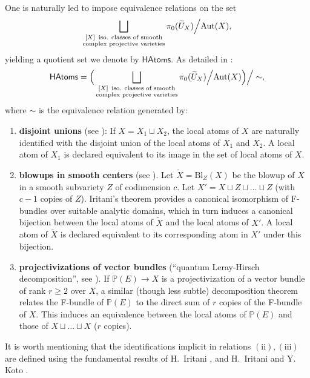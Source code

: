 \documentclass[12pt,a4paper]{amsart}
\theoremstyle{definition}
\theoremstyle{remark}
\begin{document}
One is naturally led to impose equivalence relations on the set
\[
\bigsqcup_{\substack{
      [X]\text{\, iso. classes of smooth}\\
      \text{complex projective varieties}
    }}
    \pi_{0}(\widetilde U_{X}) \Big/ \mathrm{Aut}(X),
\]
yielding a quotient set we denote by \(\mathsf{HAtoms}\). As detailed in \cite{katzarkovpantevyu}:
\[
\mathsf{HAtoms}
  = \Big(\bigsqcup_{\substack{
      [X]\text{\, iso. classes of smooth}\\
      \text{complex projective varieties}
    }}
    \pi_{0}(\widetilde U_{X}) \Big/ \mathrm{Aut}(X) \Big)\Big/ \sim,
\]
where \(\sim\) is the equivalence relation generated by:
\begin{enumerate}[label=(\roman*)]
  \item \textbf{disjoint unions} (see \cite[Section 5.2.3]{katzarkovpantevyu}):  If $X = X_1 \sqcup X_2$, the local atoms of $X$ are naturally identified with the disjoint union of the local atoms of $X_1$ and $X_2$. A local atom of $X_1$ is declared equivalent to its image in the set of local atoms of $X$.
  \item \textbf{blowups in smooth centers} (see \cite[Section 5.2.4]{katzarkovpantevyu}). Let $\widetilde X= \mathrm{Bl}_Z(X)$ be the blowup of $X$ in a smooth subvariety $Z$ of codimension $c$. Let $X' = X \sqcup Z \sqcup \ldots \sqcup Z$ (with $c-1$ copies of $Z$). Iritani's theorem provides a canonical isomorphism of F-bundles over suitable analytic domains, which in turn induces a canonical bijection between the local atoms of $\widetilde X$ and the local atoms of $X'$. A local atom of $\widetilde X$ is declared equivalent to its corresponding atom in $X'$ under this bijection.
  \item  \textbf{projectivizations of vector bundles} (``quantum Leray-Hirsch decomposition'', see \cite[Section 5.2.5]{katzarkovpantevyu}). If $\mathbb P(E) \to X$ is a projectivization of a vector bundle of rank $r\geq 2$ over $X$, a similar (though less subtle) decomposition theorem relates the F-bundle of $\mathbb P(E)$ to the direct sum of $r$ copies of the F-bundle of $X$. This induces an equivalence between the local atoms of $\mathbb P(E)$ and those of $X \sqcup \ldots \sqcup X$ ($r$ copies).
\end{enumerate}
It is worth mentioning that the identifications implicit in relations $\mathrm{(ii),(iii)}$ are defined using the fundamental results of H.~Iritani \cite{iritani2023quantumcohomologyblowups}, and H.~Iritani and Y. Koto \cite{iritani2024quantumcohomologyprojectivebundles}.%
\end{document}
